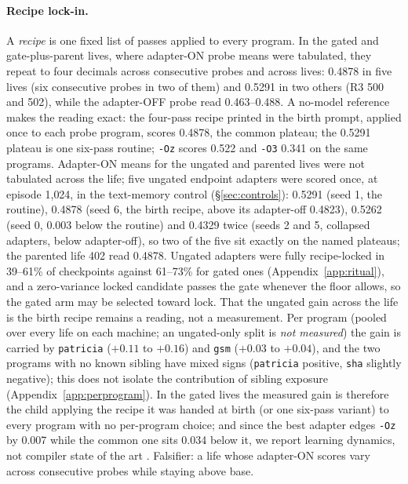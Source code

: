 \documentclass{article}
\newcommand{\nm}{\emph{not measured}}
\begin{document}
\paragraph{Recipe lock-in.} A \emph{recipe} is one fixed list of passes applied to every program. In the gated and gate-plus-parent lives, where adapter-ON probe means were tabulated, they repeat to four decimals across consecutive probes and across lives: 0.4878 in five lives (six consecutive probes in two of them) and 0.5291 in two others (R3 500 and 502), while the adapter-OFF probe read 0.463--0.488. A no-model reference makes the reading exact: the four-pass recipe printed in the birth prompt, applied once to each probe program, scores 0.4878, the common plateau; the 0.5291 plateau is one six-pass routine; \texttt{-Oz} scores 0.522 and \texttt{-O3} 0.341 on the same programs. Adapter-ON means for the ungated and parented lives were not tabulated across the life; five ungated endpoint adapters were scored once, at episode 1{,}024, in the text-memory control (\S\ref{sec:controls}): 0.5291 (seed 1, the routine), 0.4878 (seed 6, the birth recipe, above its adapter-off 0.4823), 0.5262 (seed 0, 0.003 below the routine) and 0.4329 twice (seeds 2 and 5, collapsed adapters, below adapter-off), so two of the five sit exactly on the named plateaus; the parented life 402 read 0.4878. Ungated adapters were fully recipe-locked in 39--61\% of checkpoints against 61--73\% for gated ones (Appendix~\ref{app:ritual}), and a zero-variance locked candidate passes the gate whenever the floor allows, so the gated arm may be selected toward lock. That the ungated gain across the life is the birth recipe remains a reading, not a measurement. Per program (pooled over every life on each machine; an ungated-only split is \nm) the gain is carried by \texttt{patricia} ($+0.11$ to $+0.16$) and \texttt{gsm} ($+0.03$ to $+0.04$), and the two programs with no known sibling have mixed signs (\texttt{patricia} positive, \texttt{sha} slightly negative); this does not isolate the contribution of sibling exposure (Appendix~\ref{app:perprogram}). In the gated lives the measured gain is therefore the child applying the recipe it was handed at birth (or one six-pass variant) to every program with no per-program choice; and since the best adapter edges \texttt{-Oz} by 0.007 while the common one sits 0.034 below it, we report learning dynamics, not compiler state of the art \citep{cummins2023llmcompiler}. Falsifier: a life whose adapter-ON scores vary across consecutive probes while staying above base.
\end{document}
